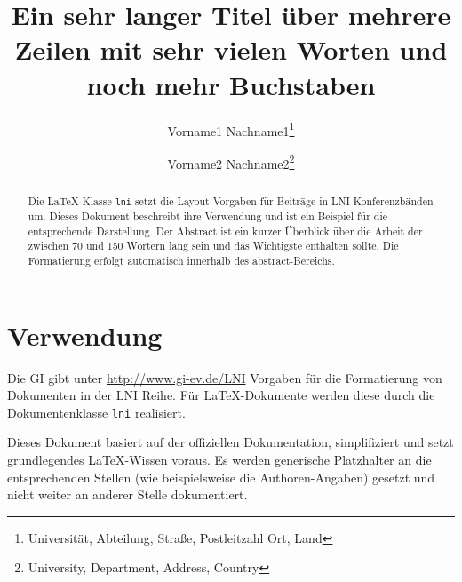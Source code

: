 \documentclass[utf8,biblatex]{lni}
\begin{document}
    \title[Ein Kurztitel]{Ein sehr langer Titel über mehrere Zeilen mit sehr vielen Worten und noch mehr Buchstaben}
    \author[Vorname1 Nachname1 \and Vorname2 Nachname2]
    {Vorname1 Nachname1\footnote{Universität, Abteilung, Straße, Postleitzahl Ort, Land } \and
    Vorname2 Nachname2\footnote{University, Department, Address, Country }}
    \maketitle

    \begin{abstract}
        Die \LaTeX-Klasse \texttt{lni} setzt die Layout-Vorgaben für Beiträge in LNI Konferenzbänden um.
        Dieses Dokument beschreibt ihre Verwendung und ist ein Beispiel für die entsprechende Darstellung.
        Der Abstract ist ein kurzer Überblick über die Arbeit der zwischen 70 und 150 Wörtern lang sein und das Wichtigste enthalten sollte.
        Die Formatierung erfolgt automatisch innerhalb des abstract-Bereichs.
    \end{abstract}


    \section{Verwendung}
    Die GI gibt unter \url{http://www.gi-ev.de/LNI} Vorgaben für die Formatierung von Dokumenten in der LNI Reihe.
    Für \LaTeX-Dokumente werden diese durch die Dokumentenklasse \texttt{lni} realisiert.

    Dieses Dokument basiert auf der offiziellen Dokumentation, simplifiziert und setzt grundlegendes LaTeX-Wissen voraus.
    Es werden generische Platzhalter an die entsprechenden Stellen (wie beispielsweise die Authoren-Angaben) gesetzt und nicht weiter an anderer Stelle dokumentiert.
\end{document}
